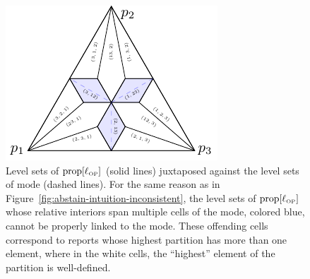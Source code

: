 \documentclass[twoside,11pt]{article}
\newcommand{\prop}[1]{\mathrm{prop}[#1]}
\newcommand{\LWW}{L_{\text{\tiny WW}}}
\newcommand{\ellOP}{\ell_{\text{\tiny OP}}}
\newcommand{\mode}{\mathrm{mode}}
\begin{document}
\begin{figure}[t]
	\begin{minipage}{0.47\linewidth}
		\centering
		\includegraphics[width=0.9\linewidth]{tikz/ordered-partition}
	\end{minipage}
	\hfill
	\begin{minipage}{0.5\linewidth}
		\caption{Level sets of $\prop{\ellOP}$ (solid lines)
			juxtaposed against the level sets of $\mode$ (dashed lines).
      For the same reason as in Figure~\ref{fig:abstain-intuition-inconsistent}, the level sets of $\prop{\ellOP}$ whose relative interiors span multiple cells of the mode, colored blue, cannot be properly linked to the mode.
      These offending cells correspond to reports whose highest partition has more than one element, where in the white cells, the ``highest'' element of the partition is well-defined.}
		\label{fig:ordered-partition}
	\end{minipage}
\end{figure}
\end{document}

